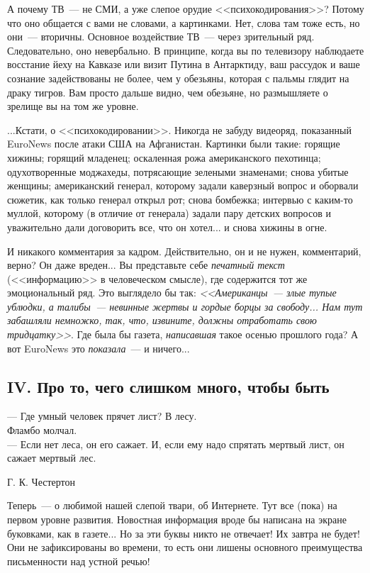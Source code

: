 \documentclass{scrbook}
\makeatletter
\newcommand{\defaultepigraphwidth}{0.5} %
\newcommand{\flqq}{<<}
\newcommand{\frqq}{>>}
\newcommand{\mdash}{~--- }
\newcommand{\sdash}{--- } %
\newcommand{\essaysection}[1]{\subsection*{#1}\nopagebreak}
\newcommand{\myepigraph}[3][\@empty]{
	\ifx\@empty#1
		\setlength{\epigraphwidth}{\defaultepigraphwidth\textwidth}
	\else
		\setlength{\epigraphwidth}{#1\textwidth}
	\fi
	\epigraph{#2}{#3}
	\setlength{\epigraphwidth}{\defaultepigraphwidth\textwidth} %
	\nopagebreak
}
\makeatother
\begin{document}
А почему ТВ{\mdash}не СМИ, а уже слепое орудие {\flqq}психокодирования{\frqq}? Потому что оно общается с вами не словами, а картинками. Нет, слова там тоже есть, но они{\mdash}вторичны. Основное воздействие ТВ{\mdash}через зрительный ряд. Следовательно, оно невербально. В принципе, когда вы по телевизору наблюдаете восстание йеху на Кавказе или визит Путина в Антарктиду, ваш рассудок и ваше сознание задействованы не более, чем у обезьяны, которая с пальмы глядит на драку тигров. Вам просто дальше видно, чем обезьяне, но размышляете о зрелище вы на том же уровне.

...Кстати, о {\flqq}психокодировании{\frqq}. Никогда не забуду видеоряд, показанный EuroNews после атаки США на Афганистан. Картинки были такие: горящие хижины; горящий младенец; оскаленная рожа американского пехотинца; одухотворенные моджахеды, потрясающие зелеными знаменами; снова убитые женщины; американский генерал, которому задали каверзный вопрос и оборвали сюжетик, как только генерал открыл рот; снова бомбежка; интервью с каким-то муллой, которому (в отличие от генерала) задали пару детских вопросов и уважительно дали договорить все, что он хотел... и снова хижины в огне.

И никакого комментария за кадром. Действительно, он и не нужен, комментарий, верно? Он даже вреден... Вы представьте себе \emph{печатный текст} ({\flqq}информацию{\frqq} в человеческом смысле), где содержится тот же эмоциональный ряд. Это выглядело бы так: \emph{{\flqq}Американцы{\mdash}злые тупые ублюдки, а талибы{\mdash}невинные жертвы и гордые борцы за свободу... Нам тут забашляли немножко, так, что, извините, должны отработать свою тридцатку{\frqq}}. Где была бы газета, \emph{написавшая} такое осенью прошлого года? А вот EuroNews это \emph{показала}{\mdash}и ничего...

\essaysection{IV. Про то, чего слишком много, чтобы быть}

\myepigraph{{\sdash}Где умный человек прячет лист? В лесу. \\
Фламбо молчал. \\
{\sdash}Если нет леса, он его сажает. И, если ему надо спрятать мертвый лист, он сажает мертвый лес.}
{Г. К. Честертон}

Теперь{\mdash}о любимой нашей слепой твари, об Интернете. Тут все (пока) на первом уровне развития. Новостная информация вроде бы написана на экране буковками, как в газете... Но за эти буквы никто не отвечает! Их завтра не будет! Они не зафиксированы во времени, то есть они лишены основного преимущества письменности над устной речью!
\end{document}
